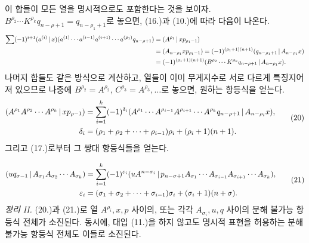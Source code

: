 이 합들이 모든 열을 명시적으로도 포함한다는 것을 보이자. $B^{\rho_2}\cdots K^{\rho_k}q_{n-\rho+1}=q_{n-\rho_1+1}$로 놓으면, (16.)과 (10.)에 따라 다음이 나온다.
\begin{align*}
\sum(-1)^{i+1}(a^{(i)}\,|\,x)(a^{(1)}\cdots a^{(i-1)}a^{(i+1)}\cdots a^{(\rho_1)}q_{n-\rho+1})
&=(A^{\rho_1}\,|\,xp_{\rho_1-1})\\
&=(A_{n-\rho_1}xp_{\rho_1-1})=(-1)^{(\rho_1+1)(n+1)}(q_{n-\rho_1+1}\,|\,A_{n-\rho_1}x)\\
&=(-1)^{(\rho_1+1)(n+1)}(B^{\rho_2}\cdots K^{\rho_k}q_{n-\rho+1}\,|\,A_{n-\rho_1}x).
\end{align*}
나머지 합들도 같은 방식으로 계산하고, 열들이 이미 무게지수로 서로 다르게 특징지어져 있으므로 나중에 $B^{\rho_2}=A^{\rho_2}$, $C^{\rho_3}=A^{\rho_3},\ldots$로 놓으면, 원하는 항등식을 얻는다.
\begin{equation}
\begin{aligned}
(A^{\rho_1}A^{\rho_2}\cdots A^{\rho_k}\,|\,xp_{\rho-1})
&=\sum_{i=1}^{k}(-1)^{\delta_i}(A^{\rho_1}\cdots A^{\rho_{i-1}}A^{\rho_{i+1}}\cdots A^{\rho_k}q_{n-\rho+1}\,|\,A_{n-\rho_i}x),\\
\delta_i&=(\rho_1+\rho_2+\cdots+\rho_{i-1})\rho_i+(\rho_i+1)(n+1).
\end{aligned}
\tag{20}
\end{equation}
그리고 (17.)로부터 그 쌍대 항등식들을 얻는다.

\begin{equation}
\begin{aligned}
(u q_{\sigma-1}\,|\,A_{\sigma_1}A_{\sigma_2}\cdots A_{\sigma_k})
&=\sum_{i=1}^{k}(-1)^{\varepsilon_i}(u A^{n-\sigma_i}\,|\,p_{n-\sigma+1}A_{\sigma_1}\cdots A_{\sigma_{i-1}}A_{\sigma_{i+1}}\cdots A_{\sigma_k}),\\
\varepsilon_i&=(\sigma_1+\sigma_2+\cdots+\sigma_{i-1})\sigma_i+(\sigma_i+1)(n+\sigma).
\end{aligned}
\tag{21}
\end{equation}
\emph{정리 II.} (20.)과 (21.)로 열 $A^{\rho_i},x,p$ 사이의, 또는 각각 $A_{\sigma_i},u,q$ 사이의 분해 불가능 항등식 전체가 소진된다. 동시에, 대입 (11.)을 하지 않고도 명시적 표현을 허용하는 분해 불가능 항등식 전체도 이들로 소진된다.

